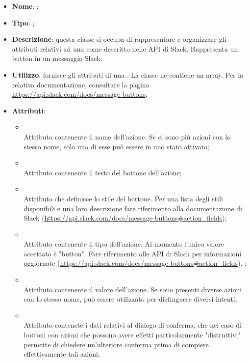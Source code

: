 \begin{itemize}
	\item \textbf{Nome}: ;
	\item \textbf{Tipo}: ;
	\item \textbf{Descrizione}: questa classe si occupa di rappresentare e organizzare gli attributi relativi ad una  come descritto nelle API di Slack. Rappresenta un button in un messaggio Slack;
	\item \textbf{Utilizzo}: fornisce gli attributi di una . La classe  ne contiene un array.
Per la relativa documentazione, consultare la pagina \url{https://api.slack.com/docs/message-buttons};
	\item \textbf{Attributi}:
	\begin{itemize}
		\item[]  \\
		Attributo contenente il nome dell'azione. Se ci sono più azioni con lo stesso nome, solo una di esse può essere in uno stato attivato;
		\item[]  \\
		Attributo contenente il testo del bottone dell'azione;
		\item[]  \\
		Attributo che definisce lo stile del bottone. Per una lista degli stili disponibili e una loro descrizione fare riferimento alla documentazione di Slack (\url{https://api.slack.com/docs/message-buttons#action_fields});
		\item[]  \\
		Attributo contenente il tipo dell'azione. Al momento l'unico valore accettato è "button". Fare riferimento alle API di   Slack per informazioni aggiornate (\url{https://api.slack.com/docs/message-buttons#action_fields}). ;
		\item[]  \\
		Attributo contenente il valore dell'azione. Se sono presenti diverse azioni con lo stesso nome, può essere utilizzato per distinguere diversi intenti;
		\item[]  \\
		Attributo contenete i dati relativi al dialogo di conferma, che nel caso di bottoni con azioni che possono avere effetti particolarmente "distruttivi" permette di chiedere un'ulteriore conferma prima di compiere effettivamente tali azioni;
	\end{itemize}
\end{itemize}
\FloatBarrier

